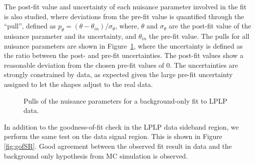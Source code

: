 The post-fit value and uncertainty of each nuisance parameter involved in the fit is also studied, where deviations from the pre-fit value is quantified through the ``pull'', defined as $p_{\theta} = (\theta - \theta_{in})/\sigma_\theta$, where, $\theta$ and $\sigma_\theta$ are the post-fit value of the nuisance parameter and its uncertainty, and $\theta_{in}$ the pre-fit value. The pulls for all nuisance parameters are shown in Figure~\ref{fig:gofLPLP}, where the uncertainty is defined as the ratio between the post- and pre-fit uncertainties. The post-fit values show a reasonable deviation from the chosen pre-fit values of 0. The uncertainties are strongly constrained by data, as expected given the large pre-fit uncertainty assigned to let the shapes adjust to the real data.
\begin{figure}[h!]
\centering
{}
\caption{Pulls of the nuisance parameters for a background-only fit to LPLP data.}
\label{fig:gofLPLP}
\end{figure}
In addition to the goodness-of-fit check in the LPLP data sideband region, we perform the same test on the data signal region. This is shown in Figure \ref{fig:gofSR}. Good agreement between the observed fit result in data and the background only hypothesis from MC simulation is observed.
